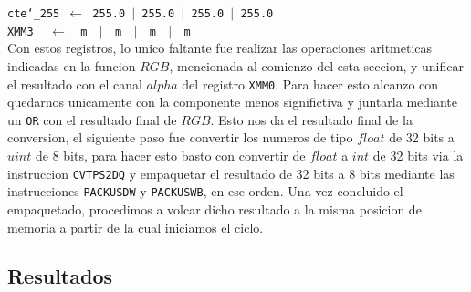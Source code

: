 \noindent
\texttt{cte\char`_255 $\gets$ 255.0 $\vert$ 255.0 $\vert$ 255.0 $\vert$ 255.0}\\
\texttt{XMM3 $\ \ \ \gets\ \ $ m $\ \ \vert\ \ $ m $\ \ \vert\ \ $ m $\ \ \vert\ \ $ m}\\

Con estos registros, lo unico faltante fue realizar las operaciones aritmeticas indicadas en la funcion $RGB$, mencionada al comienzo del esta seccion, y unificar el resultado con el canal $alpha$ del registro \texttt{XMM0}. Para hacer esto alcanzo con quedarnos unicamente con la componente menos significtiva y juntarla mediante un \texttt{OR} con el resultado final de $RGB$. Esto nos da el resultado final de la conversion, el siguiente paso fue convertir los numeros de tipo $float$ de 32 bits a $uint$ de 8 bits, para hacer esto basto con convertir de $float$ a $int$ de 32 bits via la instruccion \texttt{CVTPS2DQ} y empaquetar el resultado de 32 bits a 8 bits mediante las instrucciones \texttt{PACKUSDW} y \texttt{PACKUSWB}, en ese orden. Una vez concluido el empaquetado, procedimos a volcar dicho resultado a la misma posicion de memoria a partir de la cual iniciamos el ciclo.

\subsection{Resultados}






